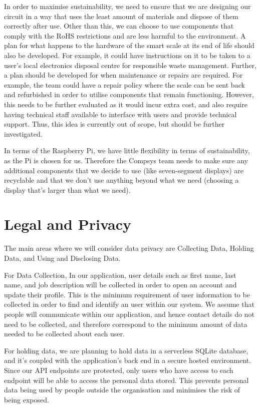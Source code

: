 In order to maximise sustainability, we need to ensure that we are designing our circuit in a way that uses the least amount of materials and dispose of them correctly after use. Other than this, we can choose to use components that comply with the RoHS restrictions and are less harmful to the environment. A plan for what happens to the hardware of the smart scale at its end of life should also be developed. For example, it could have instructions on it to be taken to a user’s local electronics disposal centre for responsible waste management. Further, a plan should be developed for when maintenance or repairs are required. For example, the team could have a repair policy where the scale can be sent back and refurbished in order to utilise components that remain functioning. However, this needs to be further evaluated as it would incur extra cost, and also require having technical staff available to interface with users and provide technical support. Thus, this idea is currently out of scope, but should be further investigated.

In terms of the Raspberry Pi, we have little flexibility in terms of sustainability, as the Pi is chosen for us. Therefore the Compsys team needs to make sure any additional components that we decide to use (like seven-segment displays) are recyclable and that we don’t use anything beyond what we need (choosing a display that’s larger than what we need). 


\section{Legal and Privacy}

The main areas where we will consider data privacy are Collecting Data, Holding Data, and Using and Disclosing Data.

For Data Collection, In our application, user details such as first name, last name, and job description will be collected in order to open an account and update their profile. This is the minimum requirement of user information to be collected in order to find and identify an user within our system. We assume that people will communicate within our application, and hence contact details do not need to be collected, and therefore correspond to the minimum amount of data needed to be collected about each user.

For holding data, we are planning to hold data in a serverless SQLite database, and it's coupled with the application's back end in a secure hosted environment. Since our API endpoints are protected, only users who have access to each endpoint will be able to access the personal data stored. This prevents personal data being used by people outside the organisation and minimises the risk of being exposed.

